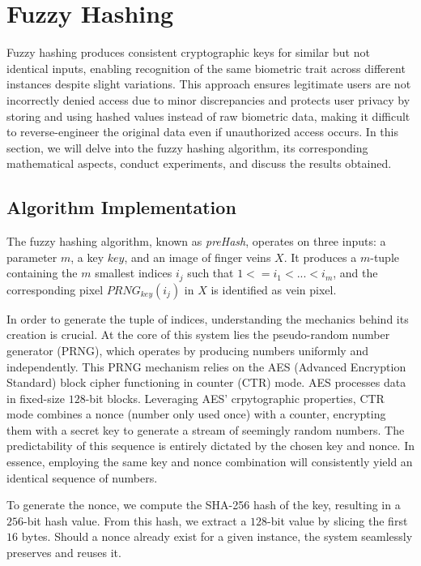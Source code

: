 \section{Fuzzy Hashing}
\label{sec:Fuzzy Hashing}
Fuzzy hashing produces consistent cryptographic keys for similar but not identical inputs, enabling recognition of the same biometric trait across different instances despite slight variations. This approach ensures legitimate users are not incorrectly denied access due to minor discrepancies and protects user privacy by storing and using hashed values instead of raw biometric data, making it difficult to reverse-engineer the original data even if unauthorized access occurs. 
In this section, we will delve into the fuzzy hashing algorithm, its corresponding mathematical aspects, conduct experiments, and discuss the results obtained.
\subsection{Algorithm Implementation}

The fuzzy hashing algorithm, known as \textit{preHash}, operates on three inputs: a parameter \(m\), a key \(key\), and an image of finger veins \(X\). It produces a \(m\)-tuple containing the \(m\) smallest indices \(i_j\) such that \(1 <= i_1 < ... < i_m\), and the corresponding pixel \(PRNG_{key}(i_j)\) in \(X\) is identified as vein pixel.

In order to generate the tuple of indices, understanding the mechanics behind its creation is crucial. At the core of this system lies the pseudo-random number generator (PRNG), which operates by producing numbers uniformly and independently. This PRNG mechanism relies on the AES (Advanced Encryption Standard) block cipher functioning in counter (CTR) mode. AES processes data in fixed-size \(128\)-bit blocks. Leveraging AES' crpytographic properties, CTR mode combines a nonce (number only used once) with a counter, encrypting them with a secret key to generate a stream of seemingly random numbers. 
The predictability of this sequence is entirely dictated by the chosen key and nonce. In essence, employing the same key and nonce combination will consistently yield an identical sequence of numbers. 

To generate the nonce, we compute the SHA-256 hash of the key, resulting in a \(256\)-bit hash value. From this hash, we extract a \(128\)-bit value by slicing the first \(16\) bytes. Should a nonce already exist for a given instance, the system seamlessly preserves and reuses it. 

